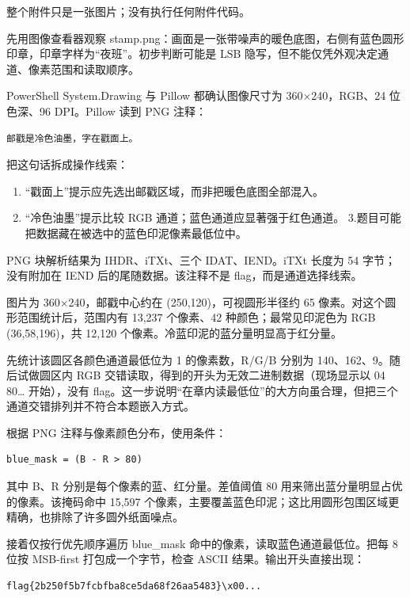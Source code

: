 整个附件只是一张图片；没有执行任何附件代码。

先用图像查看器观察 stamp.png：画面是一张带噪声的暖色底图，右侧有蓝色圆形印章，印章字样为``夜班''。初步判断可能是 LSB 隐写，但不能仅凭外观决定通道、像素范围和读取顺序。

PowerShell System.Drawing 与 Pillow 都确认图像尺寸为 360×240，RGB、24 位色深、96 DPI。Pillow 读到 PNG 注释：

\begin{verbatim}
邮戳是冷色油墨，字在戳面上。
\end{verbatim}

把这句话拆成操作线索：

\begin{enumerate}
\def\labelenumi{\arabic{enumi}.}
\tightlist
\item
  ``戳面上''提示应先选出邮戳区域，而非把暖色底图全部混入。
\item
  ``冷色油墨''提示比较 RGB 通道；蓝色通道应显著强于红色通道。 3.题目可能把数据藏在被选中的蓝色印泥像素最低位中。
\end{enumerate}

PNG 块解析结果为 IHDR、iTXt、三个 IDAT、IEND。iTXt 长度为 54 字节；没有附加在 IEND 后的尾随数据。该注释不是 flag，而是通道选择线索。

图片为 360×240，邮戳中心约在 (250,120)，可视圆形半径约 65 像素。对这个圆形范围统计后，范围内有 13,237 个像素、42 种颜色；最常见印泥色为 RGB (36,58,196)，共 12,120 个像素。冷蓝印泥的蓝分量明显高于红分量。

先统计该圆区各颜色通道最低位为 1 的像素数，R/G/B 分别为 140、162、9。随后试做圆区内 RGB 交错读取，得到的开头为无效二进制数据（现场显示以 04 80\ldots{} 开始），没有 flag。这一步说明``在章内读最低位''的大方向虽合理，但把三个通道交错排列并不符合本题嵌入方式。

根据 PNG 注释与像素颜色分布，使用条件：

\begin{verbatim}
blue_mask = (B - R > 80)
\end{verbatim}

其中 B、R 分别是每个像素的蓝、红分量。差值阈值 80 用来筛出蓝分量明显占优的像素。该掩码命中 15,597 个像素，主要覆盖蓝色印泥；这比用圆形包围区域更精确，也排除了许多圆外纸面噪点。

接着仅按行优先顺序遍历 blue\_mask 命中的像素，读取蓝色通道最低位。把每 8 位按 MSB-first 打包成一个字节，检查 ASCII 结果。输出开头直接出现：

\begin{verbatim}
flag{2b250f5b7fcbfba8ce5da68f26aa5483}\x00...
\end{verbatim}

